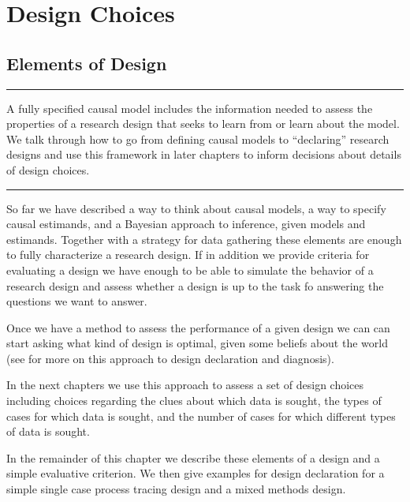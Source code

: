 \documentclass[
  12pt,
]{book}
\begin{document}
\hypertarget{part-design-choices}{%
\part{Design Choices}\label{part-design-choices}}

\hypertarget{elements-of-design}{%
\chapter{Elements of Design}\label{elements-of-design}}

\begin{center}\rule{0.5\linewidth}{0.5pt}\end{center}

A fully specified causal model includes the information needed to assess the properties of a research design that seeks to learn from or learn about the model. We talk through how to go from defining causal models to ``declaring'' research designs and use this framework in later chapters to inform decisions about details of design choices.

\begin{center}\rule{0.5\linewidth}{0.5pt}\end{center}

So far we have described a way to think about causal models, a way to specify causal estimands, and a Bayesian approach to inference, given models and estimands. Together with a strategy for data gathering these elements are enough to fully characterize a research design. If in addition we provide criteria for evaluating a design we have enough to be able to simulate the behavior of a research design and assess whether a design is up to the task fo answering the questions we want to answer.

Once we have a method to assess the performance of a given design we can can start asking what kind of design is optimal, given some beliefs about the world (see \citet{blair2016declaring} for more on this approach to design declaration and diagnosis).

In the next chapters we use this approach to assess a set of design choices including choices regarding the clues about which data is sought, the types of cases for which data is sought, and the number of cases for which different types of data is sought.

In the remainder of this chapter we describe these elements of a design and a simple evaluative criterion. We then give examples for design declaration for a simple single case process tracing design and a mixed methods design.
\end{document}
